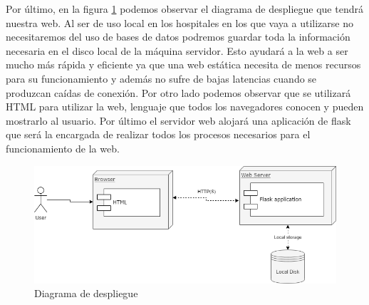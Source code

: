Por último, en la figura \ref{fig:deploy} podemos observar el diagrama de despliegue que tendrá nuestra web. Al ser de uso local en los hospitales en los que vaya a utilizarse no necesitaremos del uso de bases de datos podremos guardar toda la información necesaria en el disco local de la máquina servidor. Esto ayudará a la web a ser mucho más rápida y eficiente ya que una web estática necesita de menos recursos para su funcionamiento y además no sufre de bajas latencias cuando se produzcan caídas de conexión. Por otro lado podemos observar que se utilizará HTML para utilizar la web, lenguaje que todos los navegadores conocen y pueden mostrarlo al usuario. Por último el servidor web alojará una aplicación de flask que será la encargada de realizar todos los procesos necesarios para el funcionamiento de la web.

\begin{figure}[H]
	\centering
	\includegraphics[width=1\textwidth]{images/diagramaDespliegueWeb.png}
	\caption{Diagrama de despliegue}
	\label{fig:deploy}
\end{figure}


\newpage
